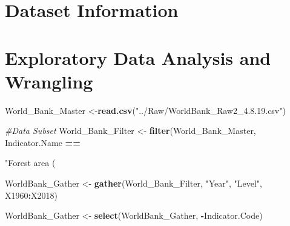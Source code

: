 \documentclass[12pt,]{article}
\newenvironment{Shaded}{\begin{snugshade}}{\end{snugshade}}
\newcommand{\KeywordTok}[1]{\textcolor[rgb]{0.13,0.29,0.53}{\textbf{#1}}}
\newcommand{\StringTok}[1]{\textcolor[rgb]{0.31,0.60,0.02}{#1}}
\newcommand{\CommentTok}[1]{\textcolor[rgb]{0.56,0.35,0.01}{\textit{#1}}}
\newcommand{\OperatorTok}[1]{\textcolor[rgb]{0.81,0.36,0.00}{\textbf{#1}}}
\newcommand{\NormalTok}[1]{#1}
\begin{document}
\newpage

\section{Dataset Information}\label{dataset-information}

\newpage

\section{Exploratory Data Analysis and
Wrangling}\label{exploratory-data-analysis-and-wrangling}

\begin{Shaded}
\begin{Highlighting}[]
\NormalTok{World_Bank_Master <-}\KeywordTok{read.csv}\NormalTok{(}\StringTok{"../Raw/WorldBank_Raw2_4.8.19.csv"}\NormalTok{)}

\CommentTok{#Data Subset}
\NormalTok{World_Bank_Filter <-}\StringTok{ }\KeywordTok{filter}\NormalTok{(World_Bank_Master, Indicator.Name }\OperatorTok{==}\StringTok{ "Forest area (%

\NormalTok{WorldBank_Gather <-}\StringTok{ }\KeywordTok{gather}\NormalTok{(World_Bank_Filter, }\StringTok{"Year"}\NormalTok{, }\StringTok{"Level"}\NormalTok{, X1960}\OperatorTok{:}\NormalTok{X2018)}

\NormalTok{WorldBank_Gather <-}\StringTok{ }\KeywordTok{select}\NormalTok{(WorldBank_Gather, }\OperatorTok{-}\NormalTok{Indicator.Code)}

}
\end{Highlighting}
\end{Shaded}
\end{document}
